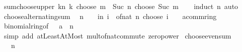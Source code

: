 \begin{isabellebody}
\isanewline
{}\isamarkupfalse%
\ sum{\isacharunderscore}{\kern0pt}choose{\isacharunderscore}{\kern0pt}upper{\isacharcolon}{\kern0pt}\ {\isachardoublequoteopen}{\isacharparenleft}{\kern0pt}{\isasymSum}k{\isasymle}n{\isachardot}{\kern0pt}\ k\ choose\ m{\isacharparenright}{\kern0pt}\ {\isacharequal}{\kern0pt}\ Suc\ n\ choose\ Suc\ m{\isachardoublequoteclose}\isanewline
%
\isadelimproof
\ \ %
\endisadelimproof
%
\isatagproof
{}\isamarkupfalse%
\ {\isacharparenleft}{\kern0pt}induct\ n{\isacharparenright}{\kern0pt}\ auto%
\endisatagproof
{\isafoldproof}%
%
\isadelimproof
\isanewline
%
\endisadelimproof
\isanewline
{}\isamarkupfalse%
\ choose{\isacharunderscore}{\kern0pt}alternating{\isacharunderscore}{\kern0pt}sum{\isacharcolon}{\kern0pt}\isanewline
\ \ {\isachardoublequoteopen}n\ {\isachargreater}{\kern0pt}\ {}\ {\isasymLongrightarrow}\ {\isacharparenleft}{\kern0pt}{\isasymSum}i{\isasymle}n{\isachardot}{\kern0pt}\ {\isacharparenleft}{\kern0pt}{\isacharminus}{\kern0pt}{}{\isacharparenright}{\kern0pt}{\isacharcircum}{\kern0pt}i\ {\isacharasterisk}{\kern0pt}\ of{\isacharunderscore}{\kern0pt}nat\ {\isacharparenleft}{\kern0pt}n\ choose\ i{\isacharparenright}{\kern0pt}{\isacharparenright}{\kern0pt}\ {\isacharequal}{\kern0pt}\ {\isacharparenleft}{\kern0pt}{}\ {\isacharcolon}{\kern0pt}{\isacharcolon}{\kern0pt}\ {\isacharprime}{\kern0pt}a{\isacharcolon}{\kern0pt}{\isacharcolon}{\kern0pt}comm{\isacharunderscore}{\kern0pt}ring{\isacharunderscore}{\kern0pt}{}{\isacharparenright}{\kern0pt}{\isachardoublequoteclose}\isanewline
%
\isadelimproof
\ \ %
\endisadelimproof
%
\isatagproof
{}\isamarkupfalse%
\ binomial{\isacharunderscore}{\kern0pt}ring{\isacharbrackleft}{\kern0pt}of\ {\isachardoublequoteopen}{\isacharminus}{\kern0pt}{}\ {\isacharcolon}{\kern0pt}{\isacharcolon}{\kern0pt}\ {\isacharprime}{\kern0pt}a{\isachardoublequoteclose}\ {}\ n{\isacharbrackright}{\kern0pt}\isanewline
\ \ \isamarkupfalse%
\ {\isacharparenleft}{\kern0pt}simp\ add{\isacharcolon}{\kern0pt}\ atLeast{}AtMost\ mult{\isacharunderscore}{\kern0pt}of{\isacharunderscore}{\kern0pt}nat{\isacharunderscore}{\kern0pt}commute\ zero{\isacharunderscore}{\kern0pt}power{\isacharparenright}{\kern0pt}%
\endisatagproof
{\isafoldproof}%
%
\isadelimproof
\isanewline
%
\endisadelimproof
\isanewline
{}\isamarkupfalse%
\ choose{\isacharunderscore}{\kern0pt}even{\isacharunderscore}{\kern0pt}sum{\isacharcolon}{\kern0pt}\isanewline
\ \ \ {\isachardoublequoteopen}n\ {\isachargreater}{\kern0pt}\ {}{\isachardoublequoteclose}\isanewline

\end{isabellebody}
